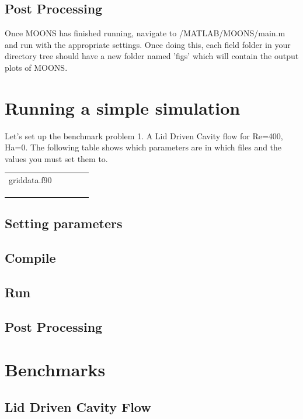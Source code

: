 \subsection{Post Processing}
Once MOONS has finished running, navigate to /MATLAB/MOONS/main.m and run with the appropriate settings. Once doing this, each field folder in your directory tree should have a new folder named 'figs' which will contain the output plots of MOONS.


\section{Running a simple simulation}
Let's set up the benchmark problem 1. A Lid Driven Cavity flow for Re=400, Ha=0.
The following table shows which parameters are in which files and the values you must set them to.

\begin{table}[h]
\begin{tabular}{lllll}
griddata.f90 &  &  &  &  \\
 &  &  &  &  \\
 &  &  &  &  \\
 &  &  &  & 
\end{tabular}
\end{table}


\subsection{Setting parameters}

\subsection{Compile}

\subsection{Run}

\subsection{Post Processing}


\section{Benchmarks}

\subsection{Lid Driven Cavity Flow}


